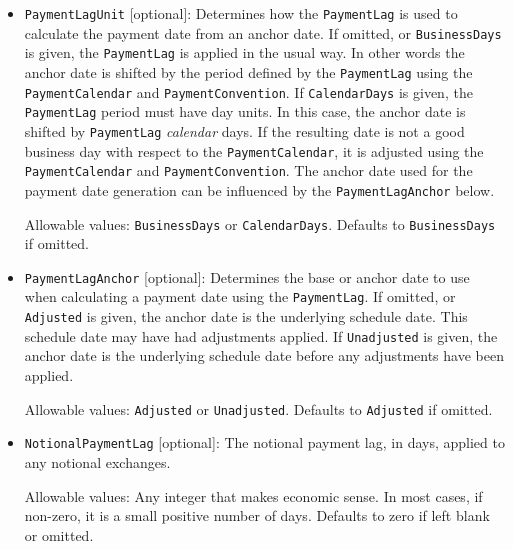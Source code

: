 \begin{itemize}
Allowable values: Usually a number of days but any valid period is allowed.
In other words, an integer followed by a string where the last character must be one of 
\lstinline!D!, \lstinline!W!, \lstinline!M! or \lstinline!Y!.
Compound period definitions also work, for example \lstinline!1Y6M! and \lstinline!-6W4D!.
Note that compound periods only work for year and month pairs or week and day pairs.
If left blank or omitted, it defaults to \lstinline!0D!.
Note also that negative periods are allowed where they make sense.

\item \lstinline!PaymentLagUnit! [optional]:
Determines how the \lstinline!PaymentLag! is used to calculate the payment date from an anchor date.
If omitted, or \lstinline!BusinessDays! is given, the \lstinline!PaymentLag! is applied in the usual way.
In other words the anchor date is shifted by the period defined by the \lstinline!PaymentLag! using the 
\lstinline!PaymentCalendar! and \lstinline!PaymentConvention!.
If \lstinline!CalendarDays! is given, the \lstinline!PaymentLag! period must have day units.
In this case, the anchor date is shifted by \lstinline!PaymentLag! \emph{calendar} days.
If the resulting date is not a good business day with respect to the \lstinline!PaymentCalendar!,
it is adjusted using the \lstinline!PaymentCalendar! and \lstinline!PaymentConvention!.
The anchor date used for the payment date generation can be influenced by the \lstinline!PaymentLagAnchor! below.

Allowable values: \lstinline!BusinessDays! or \lstinline!CalendarDays!. Defaults to \lstinline!BusinessDays! if omitted.

\item \lstinline!PaymentLagAnchor! [optional]:
Determines the base or anchor date to use when calculating a payment date using the \lstinline!PaymentLag!.
If omitted, or \lstinline!Adjusted! is given, the anchor date is the underlying schedule date.
This schedule date may have had adjustments applied.
If \lstinline!Unadjusted! is given, the anchor date is the underlying schedule date 
before any adjustments have been applied.

Allowable values: \lstinline!Adjusted! or \lstinline!Unadjusted!. Defaults to \lstinline!Adjusted! if omitted.

\item \lstinline!NotionalPaymentLag! [optional]: The notional payment lag, in days, applied to any notional exchanges.

Allowable values: Any integer that makes economic sense.
In most cases, if non-zero, it is a small positive number of days.
Defaults to zero if left blank or omitted.


\end{itemize}
